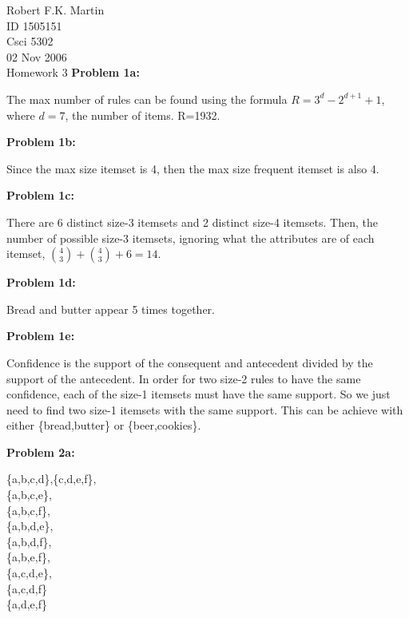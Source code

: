 \documentclass[11pt]{article}
\numberwithin{equation}{section}  %
\begin{document}


\noindent Robert F.K. Martin\\
ID 1505151\\
Csci 5302\\
02 Nov 2006\\
Homework 3
\hline
\vspace*{0.25in}
\noindent\textbf{Problem 1a: }

\noindent The max number of rules can be found using the formula $R=3^d-2^{d+1}+1$, where $d=7$, the number of items. R=1932.
\vspace*{0.25in}

\noindent\textbf{Problem 1b: }

\noindent Since the max size itemset is 4, then the max size frequent itemset is also 4.
\vspace*{0.25in}

\noindent\textbf{Problem 1c: }

\noindent There are 6 distinct size-3 itemsets and 2 distinct size-4 itemsets. Then, the number of possible size-3 itemsets, ignoring what the attributes are of each itemset, $\binom{4}{3}+\binom{4}{3}+6=14$.
\vspace*{0.25in}

\noindent\textbf{Problem 1d: }

\noindent Bread and butter appear 5 times together.
\vspace*{0.25in}

\noindent\textbf{Problem 1e: }

\noindent Confidence is the support of the consequent and antecedent divided by the support of the antecedent. In order for two size-2 rules to have the same confidence, each of the size-1 itemsets must have the same support. So we just need to find two size-1 itemsets with the same support. This can be achieve with either \{bread,butter\} or \{beer,cookies\}.
\vspace*{0.25in}

\noindent\textbf{Problem 2a: }

\noindent\{a,b,c,d\},\{c,d,e,f\},\\
\{a,b,c,e\},\\
\{a,b,c,f\},\\
\{a,b,d,e\},\\
\{a,b,d,f\},\\
\{a,b,e,f\},\\
\{a,c,d,e\},\\
\{a,c,d,f\}\\
\{a,d,e,f\}\\
\vspace*{0.25in}
\end{document}

